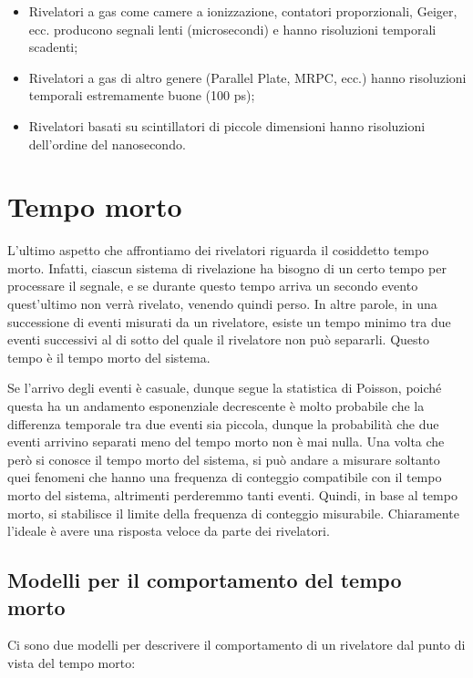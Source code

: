 \begin{itemize}
   \item Rivelatori a gas come camere a ionizzazione, contatori proporzionali, Geiger, ecc. producono segnali lenti (microsecondi) e hanno risoluzioni temporali scadenti;
   \item Rivelatori a gas di altro genere (Parallel Plate, MRPC, ecc.) hanno risoluzioni temporali estremamente buone (100 ps);
   \item Rivelatori basati su scintillatori di piccole dimensioni hanno risoluzioni dell'ordine del nanosecondo.
\end{itemize}

\section{Tempo morto}
L'ultimo aspetto che affrontiamo dei rivelatori riguarda il cosiddetto tempo morto. Infatti, ciascun sistema di rivelazione ha bisogno di un certo tempo per processare il segnale, e se durante questo tempo arriva un secondo evento quest'ultimo non verrà rivelato, venendo quindi perso. In altre parole, in una successione di eventi misurati da un rivelatore, esiste un tempo minimo tra due eventi successivi al di sotto del quale il rivelatore non può separarli. Questo tempo è il tempo morto del sistema.

Se l'arrivo degli eventi è casuale, dunque segue la statistica di Poisson, poiché questa ha un andamento esponenziale decrescente è molto probabile che la differenza temporale tra due eventi sia piccola, dunque la probabilità che due eventi arrivino separati meno del tempo morto non è mai nulla. Una volta che però si conosce il tempo morto del sistema, si può andare a misurare soltanto quei fenomeni che hanno una frequenza di conteggio compatibile con il tempo morto del sistema, altrimenti perderemmo tanti eventi. Quindi, in base al tempo morto, si stabilisce il limite della frequenza di conteggio misurabile. Chiaramente l'ideale è avere una risposta veloce da parte dei rivelatori.

\subsection{Modelli per il comportamento del tempo morto}

Ci sono due modelli per descrivere il comportamento di un rivelatore dal punto di vista del tempo morto:

